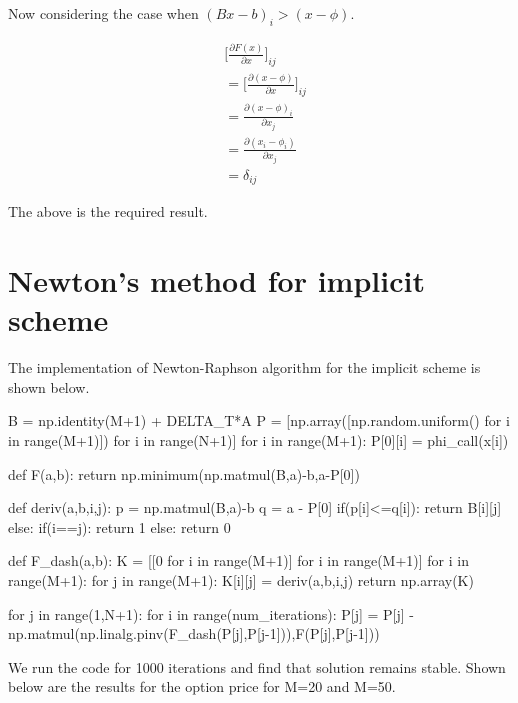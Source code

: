 \documentclass[12pt]{report}
\begin{document}
Now considering the case when   $(Bx-b)_i > (x-\phi)$.

\begin{equation*}
	\begin{aligned}
		&\Bigg[\frac{\partial F(x)}{\partial x} \Bigg]_{ij} \\
		&= \bigg[\frac{\partial (x-\phi)}{\partial x}\bigg]_{ij} \\
		&= \frac{\partial (x-\phi)_i}{\partial x_j} \\
		&= \frac{\partial (x_i-\phi_i)}{\partial x_j} \\
		&= \delta_{ij}
	\end{aligned}
\end{equation*}

The above is the required result.

\section*{Newton's method for implicit scheme}

The implementation of Newton-Raphson algorithm for the implicit scheme is shown below.
\linebreak
\begin{python}
B = np.identity(M+1) + DELTA_T*A
P = [np.array([np.random.uniform() for i in range(M+1)]) for i in range(N+1)]
for i in range(M+1):
 P[0][i] = phi_call(x[i])

def F(a,b):
 return np.minimum(np.matmul(B,a)-b,a-P[0])

def deriv(a,b,i,j):
 p = np.matmul(B,a)-b
 q = a - P[0]
 if(p[i]<=q[i]):
  return B[i][j]
 else:
  if(i==j):
   return 1
  else:
   return 0

def F_dash(a,b):
 K = [[0 for i in range(M+1)] for i in range(M+1)]
 for i in range(M+1):
  for j in range(M+1):
   K[i][j] = deriv(a,b,i,j)
 return np.array(K)

for j in range(1,N+1):
 for i in range(num_iterations):
  P[j] = P[j] - np.matmul(np.linalg.pinv(F_dash(P[j],P[j-1])),F(P[j],P[j-1]))

\end{python}

We run the code for 1000 iterations and find that solution remains stable. Shown below are the results for the option price for M=20 and M=50.
\end{document}
